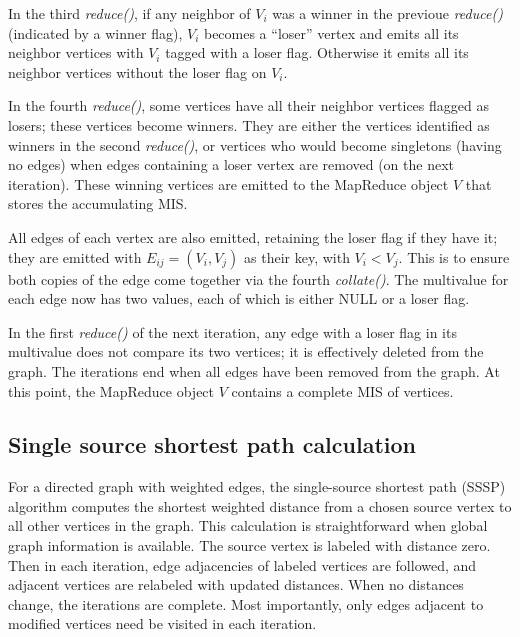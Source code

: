 In the third {\it reduce()}, if any neighbor of $V_i$ was a winner in
the previoue {\it reduce()} (indicated by a winner flag), $V_i$
becomes a ``loser'' vertex and emits all its neighbor vertices with
$V_i$ tagged with a loser flag.  Otherwise it emits all its neighbor
vertices without the loser flag on $V_i$.

In the fourth {\it reduce()}, some vertices have all their neighbor
vertices flagged as losers; these vertices become winners.  They are
either the vertices identified as winners in the second {\it
reduce()}, or vertices who would become singletons (having no edges)
when edges containing a loser vertex are removed (on the next
iteration).  These winning vertices are emitted to the MapReduce
object $V$ that stores the accumulating MIS.

All edges of each vertex are also emitted, retaining the loser flag if
they have it; they are emitted with $E_{ij} = (V_i, V_j)$ as their
key, with $V_i < V_j$.  This is to ensure both copies of the edge come
together via the fourth {\it collate()}.  The multivalue for each edge
now has two values, each of which is either NULL or a loser flag.

In the first {\it reduce()} of the next iteration, any edge with a
loser flag in its multivalue does not compare its two vertices; it is
effectively deleted from the graph.  The iterations end when all edges
have been removed from the graph.  At this point, the MapReduce object
$V$ contains a complete MIS of vertices.

\subsection{Single source shortest path calculation}

For a directed graph with weighted edges, the single-source shortest
path (SSSP) algorithm computes the shortest weighted distance from a
chosen source vertex to all other vertices in the graph.  This
calculation is straightforward when global graph information is
available.  The source vertex is labeled with distance zero.  Then in
each iteration, edge adjacencies of labeled vertices are followed, and
adjacent vertices are relabeled with updated distances.  When no
distances change, the iterations are complete.  Most importantly, only
edges adjacent to modified vertices need be visited in each iteration.

